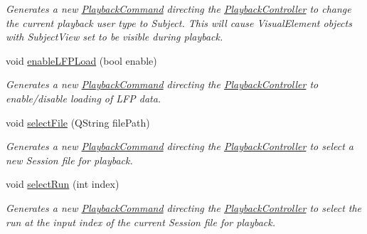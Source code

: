 \begin{DoxyCompactItemize}
\begin{DoxyCompactList}\small\item\em Generates a new \hyperlink{struct_playback_command}{Playback\-Command} directing the \hyperlink{class_playback_controller}{Playback\-Controller} to change the current playback user type to Subject. This will cause Visual\-Element objects with Subject\-View set to be visible during playback. \end{DoxyCompactList}\item 
void \hyperlink{class_playback_controller_a38903c4879896240e3f7a386402cb59e}{enable\-L\-F\-P\-Load} (bool enable)
\begin{DoxyCompactList}\small\item\em Generates a new \hyperlink{struct_playback_command}{Playback\-Command} directing the \hyperlink{class_playback_controller}{Playback\-Controller} to enable/disable loading of L\-F\-P data. \end{DoxyCompactList}\item 
\hypertarget{class_playback_controller_a000e5987b56d1f19310ae93ee44a99ef}{void \hyperlink{class_playback_controller_a000e5987b56d1f19310ae93ee44a99ef}{select\-File} (Q\-String file\-Path)}\label{class_playback_controller_a000e5987b56d1f19310ae93ee44a99ef}

\begin{DoxyCompactList}\small\item\em Generates a new \hyperlink{struct_playback_command}{Playback\-Command} directing the \hyperlink{class_playback_controller}{Playback\-Controller} to select a new Session file for playback. \end{DoxyCompactList}\item 
\hypertarget{class_playback_controller_a5d47df9e3061e9cd8c37564bcf7ceabb}{void \hyperlink{class_playback_controller_a5d47df9e3061e9cd8c37564bcf7ceabb}{select\-Run} (int index)}\label{class_playback_controller_a5d47df9e3061e9cd8c37564bcf7ceabb}

\begin{DoxyCompactList}\small\item\em Generates a new \hyperlink{struct_playback_command}{Playback\-Command} directing the \hyperlink{class_playback_controller}{Playback\-Controller} to select the run at the input index of the current Session file for playback. \end{DoxyCompactList}\end{DoxyCompactItemize}
